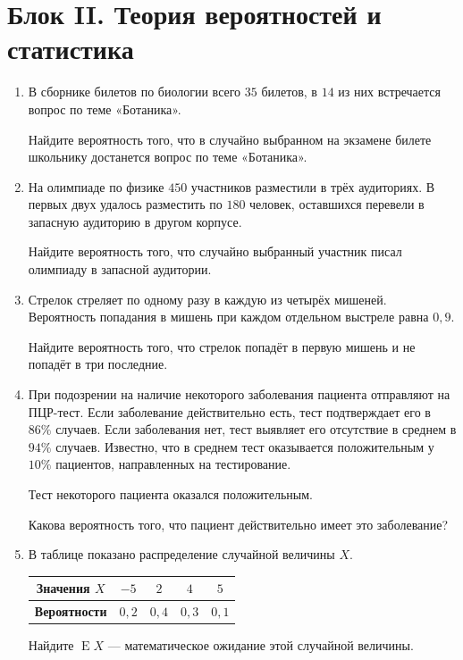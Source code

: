 \documentclass[a4paper,12pt]{article}
\newcommand{\taskspace}{\par\vspace{0.55cm}}
\begin{document}
\newpage


\section*{Блок II. Теория вероятностей и статистика}

\begin{enumerate}[resume]

\item В сборнике билетов по биологии всего $35$ билетов, в $14$ из них
встречается вопрос по теме «Ботаника».

Найдите вероятность того, что в случайно выбранном на экзамене билете
школьнику достанется вопрос по теме «Ботаника».
\taskspace

\item На олимпиаде по физике $450$ участников разместили в трёх
аудиториях. В первых двух удалось разместить по $180$ человек,
оставшихся перевели в запасную аудиторию в другом корпусе.

Найдите вероятность того, что случайно выбранный участник писал
олимпиаду в запасной аудитории.
\taskspace

\item Стрелок стреляет по одному разу в каждую из четырёх мишеней.
Вероятность попадания в мишень при каждом отдельном выстреле равна
$0{,}9$.

Найдите вероятность того, что стрелок попадёт в первую мишень и
не попадёт в три последние.
\taskspace

\item При подозрении на наличие некоторого заболевания пациента
отправляют на ПЦР-тест. Если заболевание действительно есть, тест
подтверждает его в $86\%$ случаев. Если заболевания нет, тест выявляет
его отсутствие в среднем в $94\%$ случаев. Известно, что в среднем тест
оказывается положительным у $10\%$ пациентов, направленных на
тестирование.

Тест некоторого пациента оказался положительным.

Какова вероятность того, что пациент действительно имеет это заболевание?
\taskspace

\item В таблице показано распределение случайной величины $X$.

\begin{center}
\renewcommand{\arraystretch}{1.35}
\begin{tabular}{|>{\bfseries}c|c|c|c|c|}
\hline
Значения $X$ & $-5$ & $2$ & $4$ & $5$ \\
\hline
Вероятности & $0{,}2$ & $0{,}4$ & $0{,}3$ & $0{,}1$ \\
\hline
\end{tabular}
\end{center}

Найдите $\mathop{\mathrm{E}}X$ --- математическое ожидание этой
случайной величины.
\taskspace

\end{enumerate}
\end{document}
